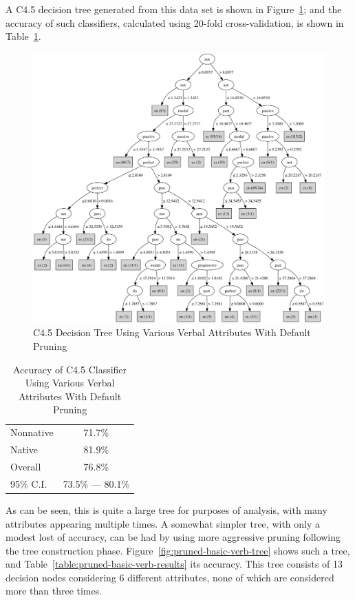 \documentclass[main.tex]{subfiles}
\begin{document}
A C4.5 decision tree generated from this data set is shown in Figure~\ref{fig:normally-pruned-basic-verb-tree}; and the accuracy of such classifiers, calculated using 20-fold cross-validation, is shown in Table~\ref{table:normally-pruned-basic-verb-results}.
\begin{figure}[htbp]
\centering
\includegraphics[width=6in]{unpruned-basic-verb-tree.pdf}
\caption{C4.5 Decision Tree Using Various Verbal Attributes With Default Pruning}
\label{fig:normally-pruned-basic-verb-tree}
\end{figure}
\begin{table}[htbp]
\centering
\caption{Accuracy of C4.5 Classifier Using Various Verbal Attributes With Default Pruning}
\begin{tabular}{l c}
\toprule
Nonnative & 71.7\% \\
Native & 81.9\% \\
Overall & 76.8\% \\
95\% C.I. & 73.5\% --- 80.1\%\\
\bottomrule
\end{tabular}
\label{table:normally-pruned-basic-verb-results}
\end{table}
As can be seen, this is quite a large tree for purposes of analysis, with many attributes appearing multiple times. A somewhat simpler tree, with only a modest lost of accuracy, can be had by using more aggressive pruning following the tree construction phase. Figure~\ref{fig:pruned-basic-verb-tree} shows such a tree, and Table~\ref{table:pruned-basic-verb-results} its accuracy. This tree consists of 13 decision nodes considering 6 different attributes, none of which are considered more than three times.
\end{document}
